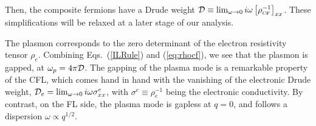 \documentclass[aps,prl,twocolumn,superscriptaddress,floatfix, 10pt,longbibliography, nofootinbib]{revtex4-2}
\begin{document}
  Then, the composite fermions have a Drude weight ${\cal D}\equiv \lim_{\omega\rightarrow 0}i\omega \left[\rho_\text{\tiny CF}^{-1}\right]_{xx}$.   These simplifications will be relaxed at a later stage of our analysis.

The plasmon corresponds to the zero determinant of the electron resistivity tensor $\rho_e$. Combining Eqs.~(\ref{ILRule}) and (\ref{eq:rhocf}), we see that the plasmon is gapped, at $\omega_p=4\pi \cal D$. The gapping of the plasma mode is a remarkable property of the CFL, which comes hand in hand with the vanishing of the electronic Drude weight, ${\cal D}_e=\lim_{\omega\rightarrow 0}i\omega\sigma^e_{{xx}}$, with $\sigma^e\equiv \rho_e^{-1}$ being the electronic conductivity. By contrast, on the FL side, the plasma mode is gapless at $q=0$, and follows a dispersion $\omega\propto q^{1/2}$.
\end{document}

